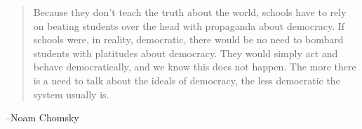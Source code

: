 \documentclass[letterpaper]{exam}
\begin{document}
  \else
    \vspace{10 cm}
    \begin{quote}
      \begin{em}
        Because they don't teach the truth about the world, schools have to rely on
        beating students over the head with propaganda about democracy. If schools were,
        in reality, democratic, there would be no need to bombard students with
        platitudes about democracy. They would simply act and behave democratically, and
        we know this does not happen. The more there is a need to talk about the ideals
        of democracy, the less democratic the system usually is.
      \end{em}
    \end{quote}
    \hspace{1 cm} --Noam Chomsky
  \fi
\end{document}
